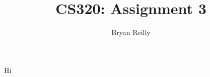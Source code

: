 \documentclass{article}
\author{Bryan Reilly}
\title{CS320: Assignment 3}
\begin{document}
\maketitle{}
Hi
\end{document}
